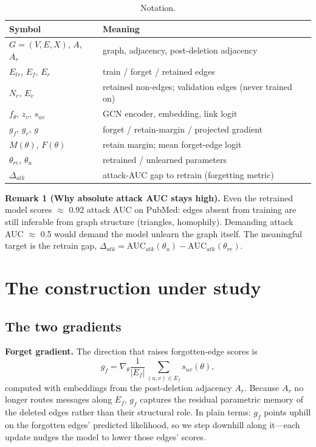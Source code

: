\documentclass[pdflatex,sn-basic,Numbered]{sn-jnl}
\begin{document}
\begin{table}[htbp]\centering\small\caption{Notation.}
\begin{tabular}{ll}\toprule Symbol & Meaning\\\midrule
$G = (V, E, X)$, $A$, $A_r$ & graph, adjacency, post-deletion adjacency\\
$E_{tr}$, $E_f$, $E_r$ & train / forget / retained edges\\
$N_r$, $E_v$ & retained non-edges; validation edges (never trained on)\\
$f_\theta$, $z_v$, $s_{uv}$ & GCN encoder, embedding, link logit\\
$g_f$, $g_r$, $g$ & forget / retain-margin / projected gradient\\
$M(\theta)$, $F(\theta)$ & retain margin; mean forget-edge logit\\
$\theta_{re}$, $\theta_u$ & retrained / unlearned parameters\\
$\Delta_{atk}$ & attack-AUC gap to retrain (forgetting metric)\\\bottomrule
\end{tabular}\end{table}

\textbf{Remark 1 (Why absolute attack AUC stays high).} Even the retrained model scores $\approx$ 0.92 attack AUC on PubMed: edges absent from training are still inferable from graph structure (triangles, homophily). Demanding attack AUC $\approx$ 0.5 would demand the model unlearn the graph itself. The meaningful target is the retrain gap, $\Delta_{atk} = \mathrm{AUC}_{atk}(\theta_u) - \mathrm{AUC}_{atk}(\theta_{re})$.

\section{The construction under study}
\subsection{The two gradients}
\textbf{Forget gradient.} The direction that raises forgotten-edge scores is
\begin{equation}
g_f = \nabla_\theta \frac{1}{|E_f|} \sum_{(u,v)\in E_f} s_{uv}(\theta),
\end{equation}
computed with embeddings from the post-deletion adjacency $A_r$. Because $A_r$ no longer routes messages along $E_f$, $g_f$ captures the residual parametric memory of the deleted edges rather than their structural role. In plain terms: $g_f$ points uphill on the forgotten edges' predicted likelihood, so we step downhill along it---each update nudges the model to lower those edges' scores.
\end{document}
